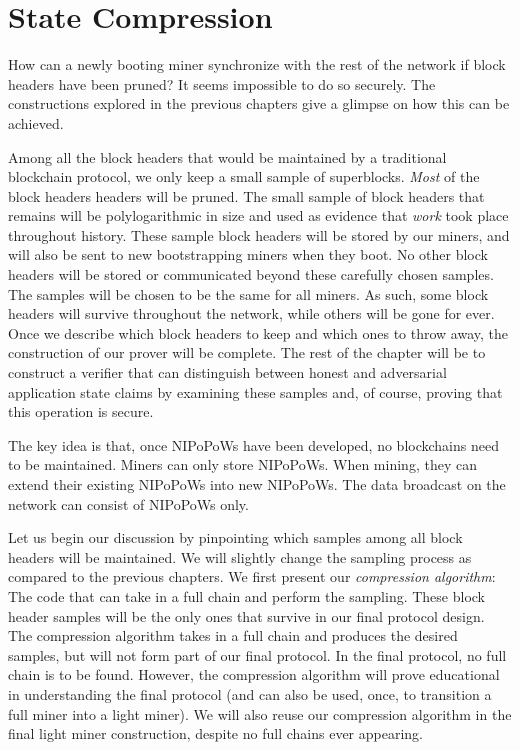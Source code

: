 \section{State Compression}

How can a newly booting miner synchronize with the rest of the network if
block headers have been pruned? It seems impossible to do so securely.
The constructions explored in the previous chapters give a glimpse on
how this can be achieved.

Among all the block headers that would be
maintained by a traditional blockchain protocol, we only keep a
small sample of superblocks.
\emph{Most} of the block headers headers will be pruned.
The small sample of block headers that remains will be
polylogarithmic in size and used
as evidence that \emph{work} took place throughout history.
These sample block headers will be stored by our miners, and will
also be sent to new bootstrapping miners when they boot. No other
block headers will be stored or communicated beyond these carefully
chosen samples. The samples will be chosen to be the same for all
miners. As such, some block headers will survive throughout the
network, while others will be gone for ever.
Once we describe which block headers to keep and which
ones to throw away, the construction of our prover will be complete.
The rest of the chapter will be to construct a verifier that can
distinguish between honest and adversarial application state claims
by examining these samples and, of course, proving that this
operation is secure.

The key idea is that, once NIPoPoWs have been developed, no blockchains
need to be maintained. Miners can only store NIPoPoWs. When mining, they
can extend their existing NIPoPoWs into new NIPoPoWs. The data broadcast
on the network can consist of NIPoPoWs only.

Let us begin our discussion by pinpointing which samples among all block headers will
be maintained. We will slightly change the sampling process as compared to the previous chapters.
We first present our \emph{compression algorithm}:
The code that can take in a full chain and perform the sampling.
These block header samples will be the only ones that survive in our
final protocol design. The compression algorithm takes in a full chain
and produces the desired samples, but will not form part of our final
protocol. In the final protocol, no full chain is to be found. However,
the compression algorithm will prove educational in understanding the
final protocol (and can also be used, once, to transition a full miner
into a light miner). We will also reuse our compression algorithm
in the final light miner construction, despite no full chains ever
appearing.

